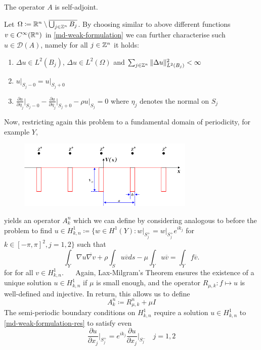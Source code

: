 \begin{remark}
	The operator $A$ is self-adjoint.	
\end{remark}


\begin{theorem} Let $\Omega \coloneqq \mathbb{R}^{n} \setminus \overline{\bigcup_{j \in \mathbb{Z}^{n}} B_{j}}$. By choosing similar to above different functions $v \in C^{\infty}(\mathbb{R}^{n})$ in \eqref{md-weak-formulation} we can further characterise such $u \in \mathcal{D}(A)$, namely for all $j \in \mathbb{Z}^{n}$ it holds:
	\begin{enumerate}
		\item $\Delta u \in L^{2}(B_{j})$, $\Delta u \in L^{2}(\Omega)$ and $\sum_{j \in \mathbb{Z}^{n}} \|\Delta u \|_{L^{2}(B_{j})}^{2} < \infty$
		\item $u \big|_{S_{j} - 0} = u \big|_{S_{j} + 0}$
		\item $\frac{\partial u}{\partial \eta_{j}} \big|_{S_{j} - 0} - \frac{\partial u}{\partial \eta_{j}} \big|_{S_{j} + 0} - \rho u \big|_{S_{j}} = 0$ where $\eta_{j}$ denotes the normal on $S_{j}$
	\end{enumerate}
\end{theorem}

Now, restricting again this problem to a fundamental domain of periodicity, for example $Y$,
\begin{figure}[h!] \centering
	  \includegraphics[width=0.75\textwidth]{Periodic_square_potential_130707} 
\end{figure}

yields an operator $A^{n}_{k}$ which we can define by considering analogous to before the problem to find $u \in H^{1}_{k, n} \coloneqq \big\{ w \in H^{1}(Y) \colon w \big|_{S_{j}^{+}} = w \big|_{S_{j}^{+}} e^{i k_{j}}$ for $k \in [-\pi, \pi]^{2}, j = 1,2 \big\}$ such that
	\begin{equation}
		\int_{Y} \nabla u \overline{\nabla v} + \rho \int_{S} u \overline{v} ds - \mu \int_{Y} u \overline{v} = \int_{Y} f \overline{v}. \label{md-weak-formulation-res}
	\end{equation} 
for for all $v \in H^{1}_{k, n}$.
~\newline ~\newline
Again, Lax-Milgram's Theorem ensures the existence of a unique solution $u \in H^{1}_{k, n}$ if $\mu$ is small enough, and the operator $R_{\mu, k} \colon f \mapsto u$ is well-defined and injective. In return, this allows us to define 
	\[ A_{k}^{n} \coloneqq R_{\mu, k}^{n} + \mu I \]
The semi-periodic boundary conditions on $H^{1}_{k,n}$ require a solution $u \in H^{1}_{k, n}$ to \eqref{md-weak-formulation-res} to satisfy even
	\[ \frac{\partial u}{\partial x_{j}}\big|_{S_{j}^{+}} = e^{ik_{j}} \frac{\partial u}{\partial x_{j}}\big|_{S_{j}^{-}} \quad j = 1,2  \]
	
